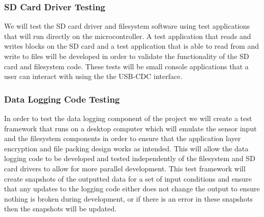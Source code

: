 \subsubsection{SD Card Driver Testing}

We will test the SD card driver and filesystem software using test applications
that will run directly on the microcontroller. A test application that reads
and writes blocks on the SD card and a test application that is able to read
from and write to files will be developed in order to validate the functionality
of the SD card and filesystem code. These tests will be small console
applications that a user can interact with using the the USB-CDC interface.

\subsubsection{Data Logging Code Testing}

In order to test the data logging component of the project we will create a test
framework that runs on a desktop computer which will emulate the sensor input
and the filesystem components in order to ensure that the application layer
encryption and file packing design works as intended. This will allow the data
logging code to be developed and tested independently of the filesystem and SD
card drivers to allow for more parallel development. This test framework will
create snapshots of the outputted data for a set of input conditions and ensure
that any updates to the logging code either does not change the output to ensure
nothing is broken during development, or if there is an error in these snapshots
then the snapshots will be updated.

